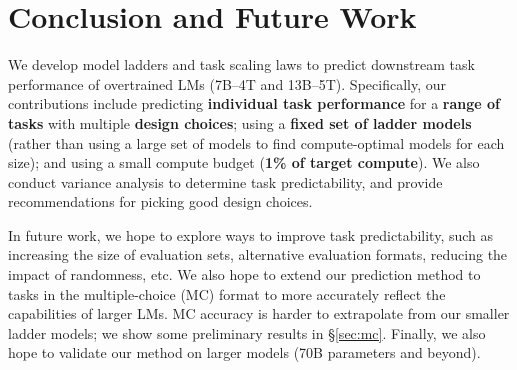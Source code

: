 \section{Conclusion and Future Work}
\label{sec:conclusion}


We develop model ladders and task scaling laws to predict downstream task performance of overtrained LMs (7B--4T and 13B--5T). Specifically, our contributions include predicting \textbf{individual task performance} for a \textbf{range of tasks} with multiple \textbf{design choices}; using a \textbf{fixed set of ladder models} (rather than using a large set of models to find compute-optimal models for each size); and using a small compute budget (\textbf{1\% of target compute}). We also conduct variance analysis to determine task predictability, and provide recommendations for picking good design choices. 

In future work, we hope to explore ways to improve task predictability, such as increasing the size of evaluation sets, alternative evaluation formats, reducing the impact of randomness, etc. We also hope to extend our prediction method to tasks in the multiple-choice (MC) format to more accurately reflect the capabilities of larger LMs. MC accuracy is harder to extrapolate from our smaller ladder models; we show some preliminary results in \S\ref{sec:mc}. Finally, we also hope to validate our method on larger models (70B parameters and beyond).

